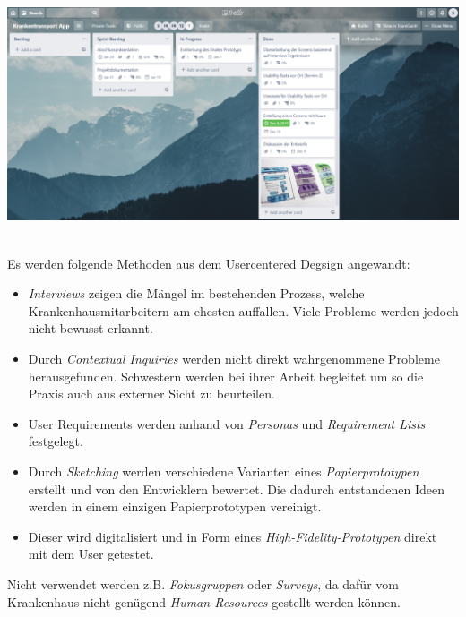 \documentclass[a4paper, ngerman, 12pt]{scrartcl}
\begin{document}
\begin{minipage}{\textwidth}
	\centering
	
	\label{img:projektplan2}
\end{minipage}\\[0.5em]

\begin{minipage}{\textwidth}
	\centering
	
	\label{img:arbeitsaufteilung}
\end{minipage}\\[0.5em]

\begin{minipage}{\textwidth}
	\centering
	\includegraphics[width=\textwidth]{Bilder/trelloboard.png}
	\label{img:trello}
\end{minipage}\\
\newpage
Es werden folgende Methoden aus dem Usercentered Degsign angewandt:
\begin{itemize}
\item \textit{Interviews} zeigen die Mängel im bestehenden Prozess, welche Krankenhausmitarbeitern am ehesten auffallen. Viele Probleme werden jedoch nicht bewusst erkannt.
\item Durch  \textit{Contextual Inquiries} werden nicht direkt wahrgenommene Probleme herausgefunden. Schwestern werden bei ihrer Arbeit begleitet um so die Praxis auch aus externer Sicht zu beurteilen.
\item User Requirements werden anhand von  \textit{Personas} und  \textit{Requirement Lists} festgelegt.
\item Durch  \textit{Sketching} werden verschiedene Varianten eines  \textit{Papierprototypen} erstellt und von den Entwicklern bewertet. Die dadurch entstandenen Ideen werden in einem einzigen Papierprototypen vereinigt.
\item Dieser wird digitalisiert und in Form eines  \textit{High-Fidelity-Prototypen} direkt mit dem User getestet.
\end{itemize}
Nicht verwendet werden z.B.  \textit{Fokusgruppen} oder  \textit{Surveys}, da dafür vom Krankenhaus nicht genügend  \textit{Human Resources} gestellt werden können.\\
\end{document}
